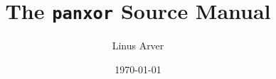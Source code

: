 \documentclass[letterpaper,twoside,12pt]{article}
\begin{document}
\title{The \texttt{panxor} Source Manual}
\author{Linus Arver}
\date{\today}
\maketitle
\tableofcontents






\end{document}
